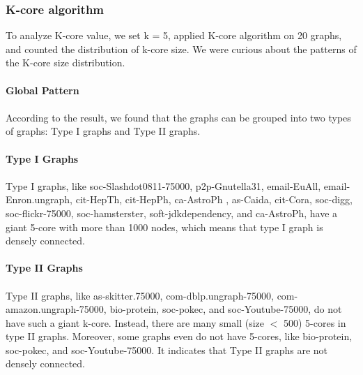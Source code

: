 
\subsubsection{K-core algorithm}
To analyze K-core value, we set k = 5, applied K-core algorithm on 20 graphs, and counted the distribution of k-core size. We were curious about the patterns of the K-core size distribution. 
\\
\\
\textbf{Global Pattern}
\\
\\
According to the result, we found that the graphs can be grouped into two types of graphs: Type I graphs and Type II graphs.
\\
\\
\textbf{Type I Graphs}
\\
\\
Type I graphs, like soc-Slashdot0811-75000, p2p-Gnutella31, email-EuAll, email-Enron.ungraph, cit-HepTh, cit-HepPh, ca-AstroPh , as-Caida, cit-Cora, soc-digg, soc-flickr-75000, soc-hamsterster, soft-jdkdependency, and ca-AstroPh, have a giant 5-core with more than 1000 nodes, which means that type I graph is densely connected. 
\\
\\
\textbf{Type II Graphs}
\\
\\
Type II graphs, like as-skitter.75000, com-dblp.ungraph-75000, com-amazon.ungraph-75000, bio-protein, soc-pokec, and soc-Youtube-75000, do not have such a giant k-core. Instead, there are many small (size $<$ 500) 5-cores in type II graphs. Moreover, some graphs even do not have 5-cores, like bio-protein, soc-pokec, and soc-Youtube-75000. It indicates that Type II graphs are not densely connected.
\\
